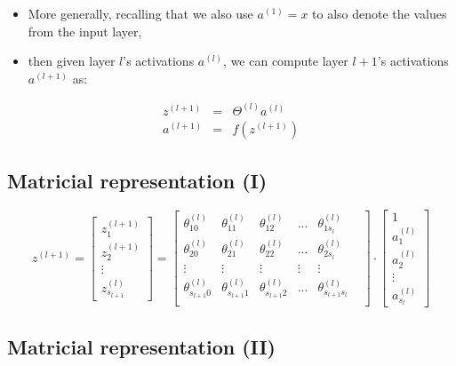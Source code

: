 \documentclass[
  letterpaper,
  DIV=11,
  numbers=noendperiod]{scrartcl}
\begin{document}
\begin{itemize}
\item
  More generally, recalling that we also use \(a^{(1)}=x\) to also
  denote the values from the input layer,
\item
  then given layer \(l\)'s activations \(a^{(l)}\), we can compute layer
  \(l+1\)'s activations \(a^{(l+1)}\) as:
\end{itemize}

\begin{eqnarray}
z^{(l+1)}&=&\Theta^{(l)}a^{(l)}\\
a^{(l+1)}&=&f(z^{(l+1)})
\end{eqnarray}

\hypertarget{matricial-representation-i}{%
\subsection{Matricial representation
(I)}\label{matricial-representation-i}}

\[
z^{(l+1)}=
\begin{bmatrix}
z_1^{(l+1)}\\
z_2^{(l+1)}\\
\vdots\\
z_{s_{l+1}}^{(l)}
\end{bmatrix}=
\begin{bmatrix}
\theta_{10}^{(l)}& \theta_{11}^{(l)}&\theta_{12}^{(l)}&...&\theta_{1s_{l}}^{(l)}&\\
\theta_{20}^{(l)}& \theta_{21}^{(l)}&\theta_{22}^{(l)}&...&\theta_{2s_{l}}^{(l)}&\\
\vdots & \vdots& \vdots & \vdots & \vdots\\
\theta_{s_{l+1}0}^{(l)}& \theta_{s_{l+1}1}^{(l)}&\theta_{s_{l+1}2}^{(l)}&...&\theta_{s_{l+1}s_{l}}^{(l)}&\\
\end{bmatrix}
\cdot\begin{bmatrix}
1\\
a_1^{(l)}\\
a_2^{(l)}\\
\vdots\\
a_{s_l}^{(l)}
\end{bmatrix}
\]

\hypertarget{matricial-representation-ii}{%
\subsection{Matricial representation
(II)}\label{matricial-representation-ii}}
\end{document}
